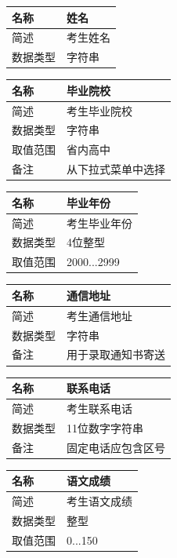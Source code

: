 \documentclass[CJK,utf8]{ctexrep}
\begin{document}
\begin{tabularx}{0.85\textwidth}{|l|X|}
	\hline
	名称 & 姓名 \\
	\hline
	简述 & 考生姓名 \\
	\hline
	数据类型 & 字符串 \\
	\hline
\end{tabularx}

\begin{tabularx}{0.85\textwidth}{|l|X|}
	\hline
	名称 & 毕业院校 \\
	\hline
	简述 & 考生毕业院校 \\
	\hline
	数据类型 & 字符串 \\
	\hline
	取值范围 & 省内高中 \\
	\hline
	备注 & 从下拉式菜单中选择 \\
	\hline
\end{tabularx}

\begin{tabularx}{0.85\textwidth}{|l|X|}
	\hline
	名称 & 毕业年份 \\
	\hline
	简述 & 考生毕业年份 \\
	\hline
	数据类型 & 4位整型 \\
	\hline
	取值范围 & 2000...2999 \\
	\hline
\end{tabularx}

\begin{tabularx}{0.85\textwidth}{|l|X|}
	\hline
	名称 & 通信地址 \\
	\hline
	简述 & 考生通信地址 \\
	\hline
	数据类型 & 字符串 \\
	\hline
	备注 & 用于录取通知书寄送 \\
	\hline
\end{tabularx}

\begin{tabularx}{0.85\textwidth}{|l|X|}
	\hline
	名称 & 联系电话 \\
	\hline
	简述 & 考生联系电话 \\
	\hline
	数据类型 & 11位数字字符串 \\
	\hline
	备注 & 固定电话应包含区号 \\
	\hline
\end{tabularx}

\begin{tabularx}{0.85\textwidth}{|l|X|}
	\hline
	名称 & 语文成绩 \\
	\hline
	简述 & 考生语文成绩 \\
	\hline
	数据类型 & 整型 \\
	\hline
	取值范围 & 0...150 \\
	\hline
\end{tabularx}
\end{document}
